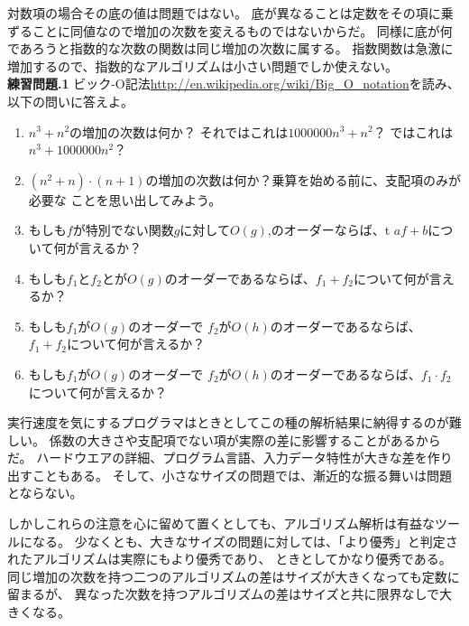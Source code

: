 \documentclass[a4j,12pt,makeidx]{jbook}
\newcommand{\tp}{\thechapter}
\begin{document}
対数項の場合その底の値は問題ではない。
底が異なることは定数をその項に乗ずることに同値なので増加の次数を変えるものではないからだ。
同様に底が何であろうと指数的な次数の関数は同じ増加の次数に属する。
指数関数は急激に増加するので、指数的なアルゴリズムは小さい問題でしか使えない。\\

\noindent
{\bf 練習問題\tp.1}
ビック-Ο記法\url{http://en.wikipedia.org/wiki/Big_O_notation}を読み、以下の問いに答えよ。
\begin{enumerate}
\item $n^3 + n^2$の増加の次数は何か？
それではこれは$1000000 n^3 + n^2$？
ではこれは$n^3 + 1000000 n^2$？

\item $(n^2 + n) \cdot (n + 1)$の増加の次数は何か？乗算を始める前に、支配項のみが必要な
ことを思い出してみよう。

\item もしも$f$が特別でない関数$g$に対して$O(g)$,のオーダーならば、t $af+b$について何が言えるか？

\item もしも$f_1$と$f_2$とが$O(g)$のオーダーであるならば、$f_1 + f_2$について何が言えるか？

\item もしも$f_1$が$O(g)$のオーダーで $f_2$が$O(h)$のオーダーであるならば、 $f_1 + f_2$について何が言えるか？

\item もしも$f_1$が$O(g)$のオーダーで $f_2$が$O(h)$のオーダーであるならば、$f_1 \cdot f_2$について何が言えるか？

\end{enumerate} \par

実行速度を気にするプログラマはときとしてこの種の解析結果に納得するのが難しい。
係数の大きさや支配項でない項が実際の差に影響することがあるからだ。
ハードウエアの詳細、プログラム言語、入力データ特性が大きな差を作り出すこともある。
そして、小さなサイズの問題では、漸近的な振る舞いは問題とならない。\par
しかしこれらの注意を心に留めて置くとしても、アルゴリズム解析は有益なツールになる。
少なくとも、大きなサイズの問題に対しては、「より優秀」と判定されたアルゴリズムは実際にもより優秀であり、
ときとしてかなり優秀である。同じ増加の次数を持つ二つのアルゴリズムの差はサイズが大きくなっても定数に留まるが、
異なった次数を持つアルゴリズムの差はサイズと共に限界なしで大きくなる。
%
\end{document}
